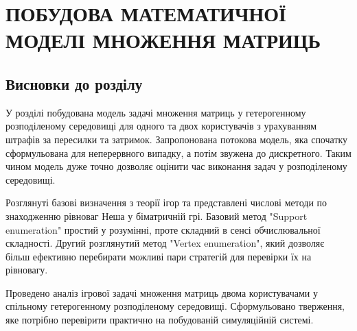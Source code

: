 
\chapter{ПОБУДОВА МАТЕМАТИЧНОЇ МОДЕЛІ МНОЖЕННЯ МАТРИЦЬ}





\section*{Висновки до розділу}

У розділі побудована модель задачі множення матриць у гетерогенному розподіленому середовищі для одного та двох користувачів з урахуванням штрафів за пересилки та затримок. Запропонована потокова модель, яка спочатку сформульована для неперервного випадку, а потім звужена до дискретного. Таким чином модель дуже точно дозволяє оцінити час виконання задач у розподіленому середовищі.

Розглянуті базові визначення з теорії ігор та представлені числові методи по знаходженню рівноваг Неша у біматричній грі. Базовий метод "Support enumeration" простий у розумінні, проте складний в сенсі обчислювальної складності. Другий розглянутий метод "Vertex enumeration", який дозволяє більш ефективно перебирати можливі пари стратегій для перевірки їх на рівновагу.

Проведено аналіз ігрової задачі множення матриць двома користувачами у спільному гетерогенному розподіленому середовищі. Сформульовано тверження, яке потрібно перевірити практично на побудованій симуляційній системі.